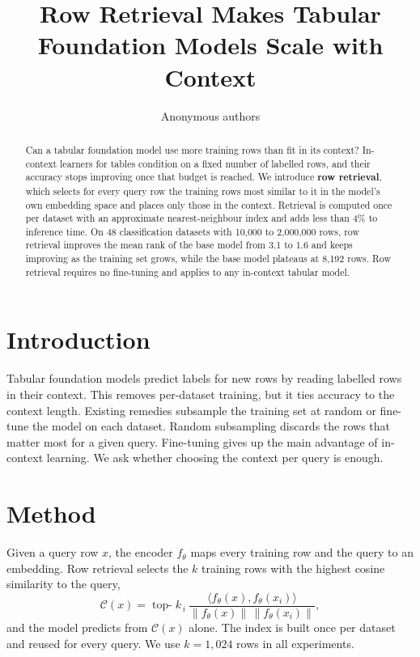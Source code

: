 \documentclass{article}
\title{Row Retrieval Makes Tabular Foundation Models Scale with Context}
\author{Anonymous authors}
\begin{document}
\maketitle

\begin{abstract}
Can a tabular foundation model use more training rows than fit in its context?
In-context learners for tables condition on a fixed number of labelled rows, and their accuracy stops improving once that budget is reached.
We introduce \textbf{row retrieval}, which selects for every query row the training rows most similar to it in the model's own embedding space and places only those in the context.
Retrieval is computed once per dataset with an approximate nearest-neighbour index and adds less than 4\% to inference time.
On 48 classification datasets with 10,000 to 2,000,000 rows, row retrieval improves the mean rank of the base model from 3.1 to 1.6 and keeps improving as the training set grows, while the base model plateaus at 8,192 rows.
Row retrieval requires no fine-tuning and applies to any in-context tabular model.
\end{abstract}

\section{Introduction}
Tabular foundation models predict labels for new rows by reading labelled rows in their context.
This removes per-dataset training, but it ties accuracy to the context length.
Existing remedies subsample the training set at random or fine-tune the model on each dataset.
Random subsampling discards the rows that matter most for a given query.
Fine-tuning gives up the main advantage of in-context learning.
We ask whether choosing the context per query is enough.

\section{Method}
Given a query row $x$, the encoder $f_\theta$ maps every training row and the query to an embedding.
Row retrieval selects the $k$ training rows with the highest cosine similarity to the query,
\begin{equation}
\mathcal{C}(x)=\operatorname{top-}k_{\,i}\ \frac{\langle f_\theta(x), f_\theta(x_i)\rangle}{\lVert f_\theta(x)\rVert\,\lVert f_\theta(x_i)\rVert},
\end{equation}
and the model predicts from $\mathcal{C}(x)$ alone.
The index is built once per dataset and reused for every query.
We use $k=1{,}024$ rows in all experiments.
\end{document}
